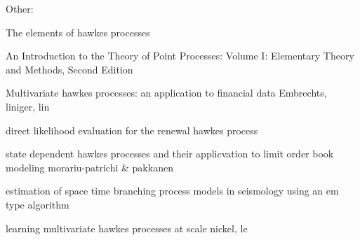 \documentclass[honours,12pt]{unswthesis}
\newcommand{\CC}{\mathcal{C}}
\numberwithin{equation}{section}
\begin{document}
\begin{thebibliography}{999}
%
%
%
%
%
%
%
%
%
%
%


Other:

The elements of hawkes processes

An Introduction to the Theory of Point Processes: Volume I: Elementary Theory and Methods, Second Edition

Multivariate hawkes processes: an application to financial data
Embrechts, liniger, lin

direct likelihood evaluation for the renewal hawkes process

state dependent hawkes processes and their applicvation to limit order book modeling
morariu-patrichi \& pakkanen

estimation of space time branching process models in seismology using an em type algorithm

learning multivariate hawkes processes at scale
nickel, le


\end{thebibliography}
\end{document}
